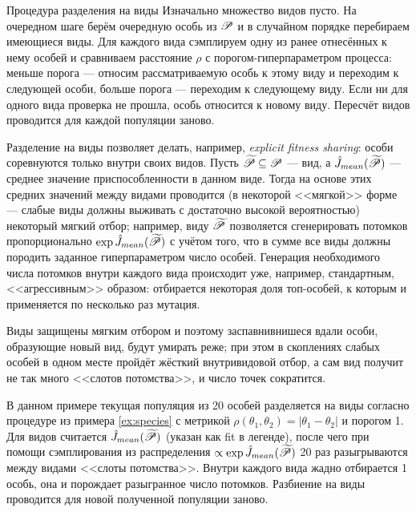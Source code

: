 \begin{exampleBox}[label=ex:species]{Процедура разделения на виды}
Изначально множество видов пусто. На очередном шаге берём очередную особь из $\mathscr{P}$ и в случайном порядке перебираем имеющиеся виды. Для каждого вида сэмплируем одну из ранее отнесённых к нему особей и сравниваем расстояние $\rho$ с порогом-гиперпараметром процесса: меньше порога --- относим рассматриваемую особь к этому виду и переходим к следующей особи, больше порога --- переходим к следующему виду. Если ни для одного вида проверка не прошла, особь относится к новому виду. Пересчёт видов проводится для каждой популяции заново.
\end{exampleBox}

Разделение на виды позволяет делать, например, \emph{explicit fitness sharing}: особи соревнуются только внутри своих видов. Пусть $\widetilde{\mathscr{P}} \subseteq \mathscr{P}$ --- вид, а $\hat{J}_{\mathop{mean}}(\widetilde{\mathscr{P}})$ --- среднее значение приспособленности в данном виде. Тогда на основе этих средних значений между видами проводится (в некоторой <<мягкой>> форме --- слабые виды должны выживать с достаточно высокой вероятностью) некоторый мягкий отбор; например, виду $\widetilde{\mathscr{P}}$ позволяется сгенерировать потомков пропорционально $\exp \hat{J}_{\mathop{mean}}(\widetilde{\mathscr{P}})$ с учётом того, что в сумме все виды должны породить заданное гиперпараметром число особей. Генерация необходимого числа потомков внутри каждого вида происходит уже, например, стандартным, <<агрессивным>> образом: отбирается некоторая доля топ-особей, к которым и применяется по несколько раз мутация.

Виды защищены мягким отбором и поэтому заспавнивнишеся вдали особи, образующие новый вид, будут умирать реже; при этом в скоплениях слабых особей в одном месте пройдёт жёсткий внутривидовой отбор, а сам вид получит не так много <<слотов потомства>>, и число точек сократится.

\begin{example}
В данном примере текущая популяция из 20 особей разделяется на виды согласно процедуре из примера \ref{ex:species} с метрикой $\rho(\theta_1, \theta_2) = |\theta_1 - \theta_2|$ и порогом 1. Для видов считается $\hat{J}_{\mathop{mean}}(\widetilde{\mathscr{P}})$ (указан как fit в легенде), после чего при помощи сэмплирования из распределения $\propto \exp \hat{J}_{\mathop{mean}}(\widetilde{\mathscr{P}})$ 20 раз разыгрываются между видами <<слоты потомства>>. Внутри каждого вида жадно отбирается 1 особь, она и порождает разыгранное число потомков. Разбиение на виды проводится для новой полученной популяции заново.
\begin{center}
\end{center}
\end{example}

